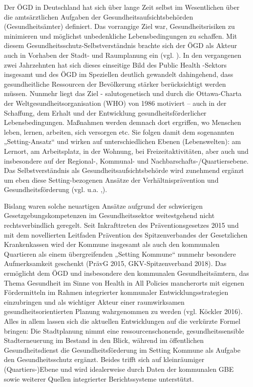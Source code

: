 \documentclass{article}
\begin{document}
Der ÖGD in Deutschland hat sich über lange Zeit selbst im Wesentlichen über die amtsärztlichen Aufgaben der Gesundheitsaufsichtsbehörden (Gesundheitsämter) definiert. Das vorrangige Ziel war, Gesundheitsrisiken zu minimieren und möglichst unbedenkliche Lebensbedingungen zu schaffen. Mit diesem Gesundheitsschutz-Selbstverständnis brachte sich der ÖGD als Akteur auch in Vorhaben der Stadt- und Raumplanung ein (vgl. \autocite{ClaßenThomas2020,RodensteinMarianne2012}). In den vergangenen zwei Jahrzehnten hat sich dieses einseitige Bild des Public Health -Sektors insgesamt und des ÖGD im Speziellen deutlich gewandelt dahingehend, dass gesundheitliche Ressourcen der Bevölkerung stärker berücksichtigt werden müssen. Nunmehr liegt das Ziel - salutogenetisch und durch die Ottawa-Charta der Weltgesundheitsorganisation (WHO) von 1986 motiviert – auch in der Schaffung, dem Erhalt und der Entwicklung gesundheitsförderlicher Lebensbedingungen. Maßnahmen werden demnach dort ergriffen, wo Menschen leben, lernen, arbeiten, sich versorgen etc. Sie folgen damit dem sogenannten „Setting-Ansatz“ und wirken auf unterschiedlichen Ebenen (Lebenswelten): am Lernort, am Arbeitsplatz, in der Wohnung, bei Freizeitaktivitäten, aber auch und insbesondere auf der Regional-, Kommunal- und Nachbarschafts-/Quartiersebene. Das Selbstverständnis als Gesundheitsaufsichtsbehörde wird zunehmend ergänzt um eben diese Setting-bezogenen Ansätze der Verhältnisprävention und Gesundheitsförderung (vgl. u.a. \autocite{BaumgartSabineundweitere2018},\autocite{BöhmeChristaundweitere2018}). 


Bislang waren solche neuartigen Ansätze aufgrund der schwierigen Gesetzgebungskompetenzen im Gesundheitssektor weitestgehend nicht rechtsverbindlich geregelt. Seit Inkrafttreten des Präventionsgesetzes 2015 und mit dem novellierten Leitfaden Prävention des Spitzenverbandes der Gesetzlichen Krankenkassen wird der Kommune insgesamt als auch den kommunalen Quartieren als einem übergreifenden „Setting Kommune“ nunmehr besondere Aufmerksamkeit geschenkt (PrävG 2015, GKV-Spitzenverband 2018). Das ermöglicht dem ÖGD und insbesondere den kommunalen Gesundheitsämtern, das Thema Gesundheit im Sinne von Health in All Policies mancherorts mit eigenen Fördermitteln im Rahmen integrierter kommunaler Entwicklungsstrategien einzubringen und als wichtiger Akteur einer raumwirksamen gesundheitsorientierten Planung wahrgenommen zu werden (vgl. Köckler 2016). Alles in allem lassen sich die aktuellen Entwicklungen auf die verkürzte Formel bringen: Die Stadtplanung nimmt eine ressourcenschonende, gesundheitssensible Stadterneuerung im Bestand in den Blick, während im öffentlichen Gesundheitsdienst die Gesundheitsförderung im Setting Kommune als Aufgabe den Gesundheitsschutz ergänzt. Beides trifft sich auf kleinräumiger (Quartiers-)Ebene und wird idealerweise durch Daten der kommunalen GBE sowie weiterer Quellen integrierter Berichtssysteme unterstützt. 
\end{document}

